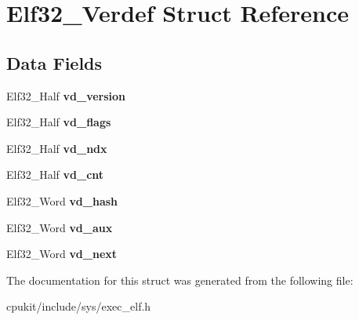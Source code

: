\hypertarget{structElf32__Verdef}{}\section{Elf32\+\_\+\+Verdef Struct Reference}
\label{structElf32__Verdef}
\subsection*{Data Fields}
\begin{DoxyCompactItemize}
\item 
\mbox{\label{structElf32__Verdef_ad2f222a352ff9e2d92199811ff094822}} 
Elf32\+\_\+\+Half {\bfseries vd\+\_\+version}
\item 
\mbox{\label{structElf32__Verdef_a782382383f96808eeddb86e3db2737c3}} 
Elf32\+\_\+\+Half {\bfseries vd\+\_\+flags}
\item 
\mbox{\label{structElf32__Verdef_afcaa14f5175bb38ecb6ef832c2aa2232}} 
Elf32\+\_\+\+Half {\bfseries vd\+\_\+ndx}
\item 
\mbox{\label{structElf32__Verdef_a38c7ed683760f798e42ff3c411ea23ba}} 
Elf32\+\_\+\+Half {\bfseries vd\+\_\+cnt}
\item 
\mbox{\label{structElf32__Verdef_aed64e7dede5f8150f10457c420b48416}} 
Elf32\+\_\+\+Word {\bfseries vd\+\_\+hash}
\item 
\mbox{\label{structElf32__Verdef_a3693473efde66cb13cecda2053c91f9d}} 
Elf32\+\_\+\+Word {\bfseries vd\+\_\+aux}
\item 
\mbox{\label{structElf32__Verdef_ac919bdca49dff2f3a04b1328903edb71}} 
Elf32\+\_\+\+Word {\bfseries vd\+\_\+next}
\end{DoxyCompactItemize}


The documentation for this struct was generated from the following file\+:\begin{DoxyCompactItemize}
\item 
cpukit/include/sys/exec\+\_\+elf.\+h\end{DoxyCompactItemize}
